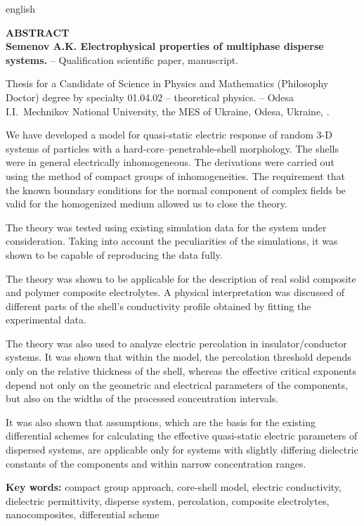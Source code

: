 \documentclass[twoside,a4paper,14pt]{vakaref}
\begin{document}
\bigskip

\begin{otherlanguage*}{english}
\begin{center}
		{\normalfont \textbf{
			ABSTRACT\\
			Semenov A.K. Electrophysical properties of multiphase disperse systems.} -- Qualification scientific paper, manuscript.}
\end{center}
\vskip 5pt

Thesis for a Candidate of Science in Physics and Mathematics (Philosophy Doctor) degree by specialty 01.04.02 -- theoretical physics. -- Odesa I.I.~Mechnikov National University, the MES of Ukraine, Odesa, Ukraine, \the\year.

\vskip 5pt

We have developed a model for quasi-static electric response of random 3-D  systems of particles with a hard-core--penetrable-shell morphology. The shells were in general electrically inhomogeneous. The derivations were carried out using the method of compact groups of inhomogeneities. The requirement that the known boundary conditions for the normal component of complex fields be valid for the homogenized medium allowed us to close the theory.

The theory was tested using existing simulation data for the system under consideration. Taking into account the peculiarities of the simulations, it was shown to be capable of reproducing the data fully.

The theory was shown to be applicable for the description of real solid composite and polymer composite electrolytes. A physical interpretation was discussed of different parts of the shell’s conductivity profile obtained by fitting the experimental data.

The theory was also used to analyze electric percolation in insulator/con\-ductor  systems. It was shown that within the model, the percolation threshold depends only on the relative thickness of the shell, whereas the effective critical exponents depend not only on the geometric and electrical parameters of the components, but also on the widths of the processed concentration intervals.

It was also shown that assumptions, which are the basis for the existing differential schemes for calculating the effective quasi-static electric parameters of dispersed systems, are applicable only for systems with slightly differing dielectric constants of the components and within narrow concentration ranges.

\vskip 10pt
\textbf{Key words:} compact group approach, core-shell model, electric conductivity, dielectric permittivity, disperse system, percolation, composite electrolytes, nanocomposites, differential scheme
	
\end{otherlanguage*}
\end{document}
